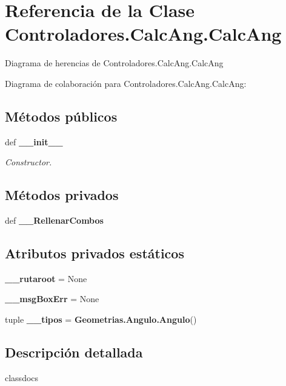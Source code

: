 \section{Referencia de la Clase Controladores.\-Calc\-Ang.\-Calc\-Ang}
\label{classControladores_1_1CalcAng_1_1CalcAng}


Diagrama de herencias de Controladores.\-Calc\-Ang.\-Calc\-Ang


Diagrama de colaboración para Controladores.\-Calc\-Ang.\-Calc\-Ang\-:
\subsection*{Métodos públicos}
\begin{DoxyCompactItemize}
\item 
def {\bf \-\_\-\-\_\-init\-\_\-\-\_\-}
\begin{DoxyCompactList}\small\item\em Constructor. \end{DoxyCompactList}\end{DoxyCompactItemize}
\subsection*{Métodos privados}
\begin{DoxyCompactItemize}
\item 
def {\bf \-\_\-\-\_\-\-Rellenar\-Combos}
\end{DoxyCompactItemize}
\subsection*{Atributos privados estáticos}
\begin{DoxyCompactItemize}
\item 
{\bf \-\_\-\-\_\-rutaroot} = None
\item 
{\bf \-\_\-\-\_\-msg\-Box\-Err} = None
\item 
tuple {\bf \-\_\-\-\_\-tipos} = {\bf Geometrias.\-Angulo.\-Angulo}()
\end{DoxyCompactItemize}


\subsection{Descripción detallada}
\begin{DoxyVerb}classdocs
\end{DoxyVerb}
 

